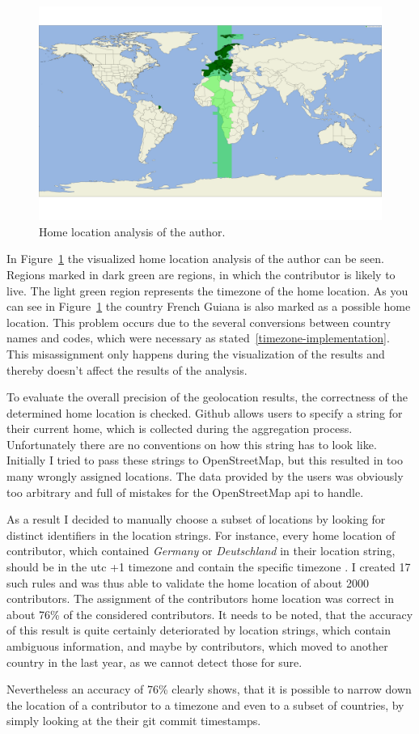 \begin{figure}[H]
    \includegraphics[scale=0.10]{./graphs/analysis/author-home-location}
    \centering
    \caption{Home location analysis of the author.}\label{fig:author-home-location}
\end{figure}

In Figure~\ref{fig:author-home-location} the visualized home location analysis of the author can be seen.
Regions marked in dark green are regions, in which the contributor is likely to live.
The light green region represents the timezone of the home location.
As you can see in Figure~\ref{fig:author-home-location} the country French Guiana is also marked as a possible home location.
This problem occurs due to the several conversions between country names and codes, which were necessary as stated~\ref{timezone-implementation}.
This misassignment only happens during the visualization of the results and thereby doesn't affect the results of the analysis.

To evaluate the overall precision of the geolocation results, the correctness of the determined home location is checked.
Github allows users to specify a string for their current home, which is collected during the aggregation process.
Unfortunately there are no conventions on how this string has to look like.
Initially I tried to pass these strings to OpenStreetMap, but this resulted in too many wrongly assigned locations.
The data provided by the users was obviously too arbitrary and full of mistakes for the OpenStreetMap \ac{api} to handle.

As a result I decided to manually choose a subset of locations by looking for distinct identifiers in the location strings.
For instance, every home location of contributor, which contained \emph{Germany} or \emph{Deutschland} in their location string, should be in the \ac{utc} +1 timezone and contain the specific timezone .
I created 17 such rules and was thus able to validate the home location of about 2000 contributors.
The assignment of the contributors home location was correct in about 76\% of the considered contributors.
It needs to be noted, that the accuracy of this result is quite certainly deteriorated by location strings, which contain ambiguous information, and maybe by contributors, which moved to another country in the last year, as we cannot detect those for sure.

Nevertheless an accuracy of 76\% clearly shows, that it is possible to narrow down the location of a contributor to a timezone and even to a subset of countries, by simply looking at the their git commit timestamps.
